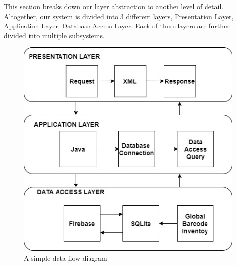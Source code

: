 This section breaks down our layer abstraction to another level of detail. Altogether, our system is divided into 3 different layers, Presentation Layer, Application Layer, Database Access Layer. Each of these layers are further divided into multiple subsystems.

\begin{figure}[h!]
	\centering
 	\includegraphics[width=\textwidth]{images/Full.jpg}
 \caption{A simple data flow diagram}
\end{figure}
